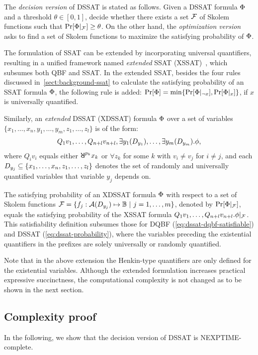 The \textit{decision version} of DSSAT is stated as follows.
Given a DSSAT formula $\Phi$ and a threshold $\theta\in[0,1]$,
decide whether there exists a set $\mathcal{F}$ of Skolem functions such that $\Pr[\Phi|_{\mathcal{F}}]\geq\theta$.
On the other hand, the \textit{optimization version} asks to find a set of Skolem functions to maximize the satisfying probability of $\Phi$.

The formulation of SSAT can be extended by incorporating universal quantifiers,
resulting in a unified framework named \textit{extended} SSAT (XSSAT)~\cite{SATHandbook-SSAT},
which subsumes both QBF and SSAT.
In the extended SSAT,
besides the four rules discussed in~\cref{sect:background-ssat} to calculate the satisfying probability of an SSAT formula $\Phi$,
the following rule is added:
$\Pr[\Phi]=\min\{\Pr[\Phi|_{\lnot x}],\Pr[\Phi|_{x}]\}$, if $x$ is universally quantified.

Similarly, an \textit{extended} DSSAT (XDSSAT) formula $\Phi$ over a set of variables
$\{x_1,\ldots,x_n,y_1,\ldots,y_m,z_1,\ldots,z_l\}$ is of the form:
\begin{align}\label{eq:dssat-xdssat}
    Q_1 v_1,\ldots,Q_{n+l} v_{n+l},\exists y_1(D_{y_1}),\ldots,\exists y_m(D_{y_m}).\phi,
\end{align}
where $Q_i v_i$ equals either $\random{p_k} x_k$ or $\forall z_k$ for some $k$ with $v_i \neq v_j$ for $i \neq j$,
and each $D_{y_j}\subseteq\{x_1,\ldots,x_n,z_1,\ldots,z_l\}$ denotes the set of randomly and universally quantified variables that variable $y_j$ depends on.

The satisfying probability of an XDSSAT formula $\Phi$ with respect to a set of Skolem functions
$\skf=\{f_j:\av{\dep{y_j}}\mapsto\booldom\ |\ j=1,\ldots,m\}$,
denoted by $\Pr[\Phi|_{\mathcal{F}}]$,
equals the satisfying probability of the XSSAT formula $Q_1 v_1,\ldots,Q_{n+l} v_{n+l}.\phi|_{\mathcal{F}}$.
This satisfiability definition subsumes those for DQBF (\cref{eq:dssat-dqbf-satisfiable}) and DSSAT (\cref{eq:dssat-probability}),
where the variables preceding the existential quantifiers in the prefixes are solely universally or randomly quantified.

Note that in the above extension the Henkin-type quantifiers are only defined for the existential variables.
Although the extended formulation increases practical expressive succinctness,
the computational complexity is not changed as to be shown in the next section.

\subsection{Complexity proof}
In the following, we show that the decision version of DSSAT is NEXPTIME-complete.

